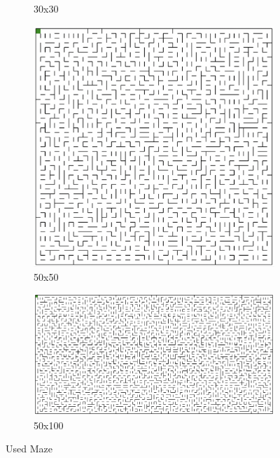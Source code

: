 \documentclass{article}
\begin{document}
\begin{figure}[h]
\begin{subfigure}[b]{0.3\textwidth}
        \caption{30x30}
    \end{subfigure}
    \newline
    \begin{subfigure}[b]{0.3\textwidth}
        \centering
        \includegraphics[width=\textwidth]{imgs/50x50.eps}
        \caption{50x50}
    \end{subfigure}
    \begin{subfigure}[b]{0.6\textwidth}
        \centering
        \includegraphics[width=\textwidth]{imgs/50x100.eps}
        \caption{50x100}
    \end{subfigure}
    \caption{Used Maze}
\end{figure}
\end{document}
